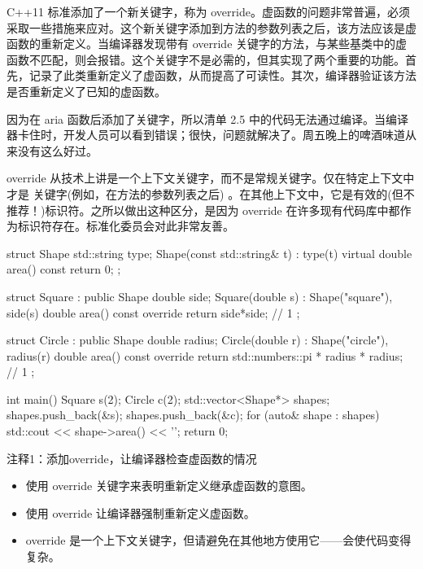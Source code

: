 C++11 标准添加了一个新关键字，称为 override。虚函数的问题非常普遍，必须采取一些措施来应对。这个新关键字添加到方法的参数列表之后，该方法应该是虚函数的重新定义。当编译器发现带有 override 关键字的方法，与某些基类中的虚函数不匹配，则会报错。这个关键字不是必需的，但其实现了两个重要的功能。首先，记录了此类重新定义了虚函数，从而提高了可读性。其次，编译器验证该方法是否重新定义了已知的虚函数。

因为在 aria 函数后添加了关键字，所以清单 2.5 中的代码无法通过编译。当编译器卡住时，开发人员可以看到错误；很快，问题就解决了。周五晚上的啤酒味道从来没有这么好过。

\begin{myTip}{}
override 从技术上讲是一个上下文关键字，而不是常规关键字。仅在特定上下文中才是 关键字(例如，在方法的参数列表之后) 。在其他上下文中，它是有效的(但不推荐！)标识符。之所以做出这种区分，是因为 override 在许多现有代码库中都作为标识符存在。标准化委员会对此非常友善。
\end{myTip}


\begin{cpp}
struct Shape {
  std::string type;
  Shape(const std::string& t) : type(t) {}
  virtual double area() const { return 0; }
};

struct Square : public Shape {
  double side;
  Square(double s) : Shape("square"), side(s) {}
  double area() const override { return side*side; } // 1
};

struct Circle : public Shape {
  double radius;
  Circle(double r) : Shape("circle"), radius(r) {}
  double area() const override { return
    std::numbers::pi * radius * radius; } // 1
};

int main() {
  Square s(2);
  Circle c(2);
  std::vector<Shape*> shapes;
  shapes.push_back(&s);
  shapes.push_back(&c);
  for (auto& shape : shapes)
    std::cout << shape->area() << '\n';
  return 0;
}
\end{cpp}

{\footnotesize
注释1：添加override，让编译器检查虚函数的情况
}


\begin{itemize}
\item
使用 override 关键字来表明重新定义继承虚函数的意图。

\item
使用 override 让编译器强制重新定义虚函数。

\item
override 是一个上下文关键字，但请避免在其他地方使用它——会使代码变得复杂。
\end{itemize}





















